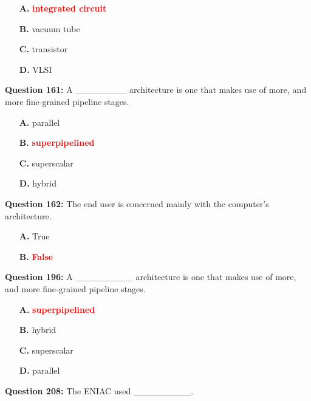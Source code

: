 \documentclass[12pt,a4paper]{article}
\begin{document}
\begin{itemize}
    \item[\textbf{A.}] \textcolor{red}{\textbf{integrated circuit}}
    \item[\textbf{B.}] vacuum tube
    \item[\textbf{C.}] transistor
    \item[\textbf{D.}] VLSI
\end{itemize}

\vspace{0.5cm}

\textbf{Question 161:} A ________ architecture is one that makes use of more, and more fine-grained pipeline stages.

\begin{itemize}
    \item[\textbf{A.}] parallel
    \item[\textbf{B.}] \textcolor{red}{\textbf{superpipelined}}
    \item[\textbf{C.}] superscalar
    \item[\textbf{D.}] hybrid
\end{itemize}

\vspace{0.5cm}

\textbf{Question 162:} The end user is concerned mainly with the computer's architecture.

\begin{itemize}
    \item[\textbf{A.}] True
    \item[\textbf{B.}] \textcolor{red}{\textbf{False}}
\end{itemize}

\vspace{0.5cm}

\textbf{Question 196:} A _________ architecture is one that makes use of more, and more fine-grained pipeline stages.

\begin{itemize}
    \item[\textbf{A.}] \textcolor{red}{\textbf{superpipelined}}
    \item[\textbf{B.}] hybrid
    \item[\textbf{C.}] superscalar
    \item[\textbf{D.}] parallel
\end{itemize}

\vspace{0.5cm}

\textbf{Question 208:} The ENIAC used _________.
\end{document}
